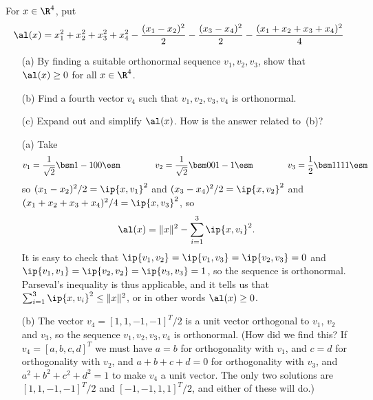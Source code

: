 \begin{exercise}
 For $x\in\R^4$, put 
 \[ \al(x) = x_1^2+x_2^2+x_3^2+x_4^2 -
      \frac{(x_1-x_2)^2}{2} -
      \frac{(x_3-x_4)^2}{2} - 
      \frac{(x_1+x_2+x_3+x_4)^2}{4}
 \] 
 \begin{itemize}
  \item[(a)] By finding a suitable orthonormal sequence $v_1,v_2,v_3$,
   show that $\al(x)\geq 0$ for all $x\in\R^4$.
  \item[(b)] Find a fourth vector $v_4$ such that $v_1,v_2,v_3,v_4$ is
   orthonormal.
  \item[(c)] Expand out and simplify $\al(x)$.  How is the answer related to~(b)? 
 \end{itemize}
\end{exercise}
\begin{solution}
 \begin{itemize}
  \item[(a)] Take
   \[ v_1 = \frac{1}{\sqrt{2}}\bsm 1 \\ -1\\ 0 \\ 0 \esm \hspace{4em} 
      v_2 = \frac{1}{\sqrt{2}}\bsm 0 \\ 0\\ 1 \\ -1 \esm \hspace{4em} 
      v_3 = \frac{1}{2} \bsm 1\\ 1\\ 1\\ 1 \esm
   \] 
   so $(x_1-x_2)^2/2=\ip{x,v_1}^2$ and $(x_3-x_4)^2/2=\ip{x,v_2}^2$
   and $(x_1+x_2+x_3+x_4)^2/4=\ip{x,v_3}^2$, so 
   \[ \al(x) = \|x\|^2 - \sum_{i=1}^3 \ip{x,v_i}^2. \]
   It is easy to check that $\ip{v_1,v_2}=\ip{v_1,v_3}=\ip{v_2,v_3}=0$
   and $\ip{v_1,v_1}=\ip{v_2,v_2}=\ip{v_3,v_3}=1$, so the sequence is
   orthonormal.  Parseval's inequality is thus applicable, and it
   tells us that $\sum_{i=1}^3\ip{x,v_i}^2\leq\|x\|^2$, or in other
   words $\al(x)\geq 0$.
  \item[(b)] The vector $v_4=[1,1,-1,-1]^T/2$ is a unit vector
   orthogonal to $v_1$, $v_2$ and $v_3$, so the sequence
   $v_1,v_2,v_3,v_4$ is orthonormal.  (How did we find this?  If
   $v_4=[a,b,c,d]^T$ we must have $a=b$ for orthogonality with $v_1$,
   and $c=d$ for orthogonality with $v_2$, and $a+b+c+d=0$ for
   orthogonality with $v_3$, and $a^2+b^2+c^2+d^2=1$ to make $v_4$ a
   unit vector.  The only two solutions are $[1,1,-1,-1]^T/2$ and
   $[-1,-1,1,1]^T/2$, and either of these will do.)

\end{itemize}
\end{solution}
